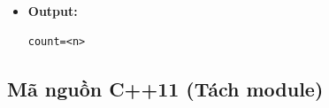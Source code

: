 \begin{itemize}
\begin{itemize}
        \item \textbf{Độ phức tạp:}
        \begin{itemize}
            \item $O(m^2 \cdot n)$
        \end{itemize}
    \end{itemize}

    \item \textbf{Output:}
    \begin{lstlisting}
count=<n>
    \end{lstlisting}
\end{itemize}

\subsection{Mã nguồn C++11 (Tách module)}
